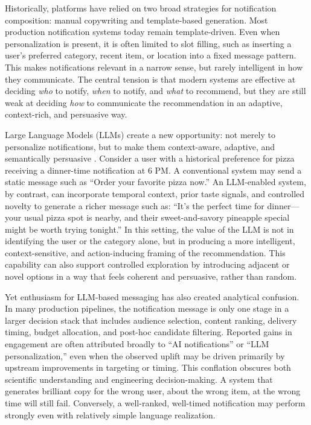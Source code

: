 \documentclass[sigconf]{acmart}
\begin{document}
Historically, platforms have relied on two broad strategies for notification composition: manual copywriting and template-based generation. Most production notification systems today remain template-driven. Even when personalization is present, it is often limited to slot filling, such as inserting a user’s preferred category, recent item, or location into a fixed message pattern. This makes notifications relevant in a narrow sense, but rarely intelligent in how they communicate. The central tension is that modern systems are effective at deciding \textit{who} to notify, \textit{when} to notify, and \textit{what} to recommend, but they are still weak at deciding \textit{how} to communicate the recommendation in an adaptive, context-rich, and persuasive way.

Large Language Models (LLMs) create a new opportunity: not merely to personalize notifications, but to make them context-aware, adaptive, and semantically persuasive \cite{vaswani2017attention}. Consider a user with a historical preference for pizza receiving a dinner-time notification at 6 PM. A conventional system may send a static message such as ``Order your favorite pizza now.'' An LLM-enabled system, by contrast, can incorporate temporal context, prior taste signals, and controlled novelty to generate a richer message such as: ``It’s the perfect time for dinner---your usual pizza spot is nearby, and their sweet-and-savory pineapple special might be worth trying tonight.'' In this setting, the value of the LLM is not in identifying the user or the category alone, but in producing a more intelligent, context-sensitive, and action-inducing framing of the recommendation. This capability can also support controlled exploration by introducing adjacent or novel options in a way that feels coherent and persuasive, rather than random.

Yet enthusiasm for LLM-based messaging has also created analytical confusion. In many production pipelines, the notification message is only one stage in a larger decision stack that includes audience selection, content ranking, delivery timing, budget allocation, and post-hoc candidate filtering. Reported gains in engagement are often attributed broadly to ``AI notifications'' or ``LLM personalization,'' even when the observed uplift may be driven primarily by upstream improvements in targeting or timing. This conflation obscures both scientific understanding and engineering decision-making. A system that generates brilliant copy for the wrong user, about the wrong item, at the wrong time will still fail. Conversely, a well-ranked, well-timed notification may perform strongly even with relatively simple language realization.
\end{document}
